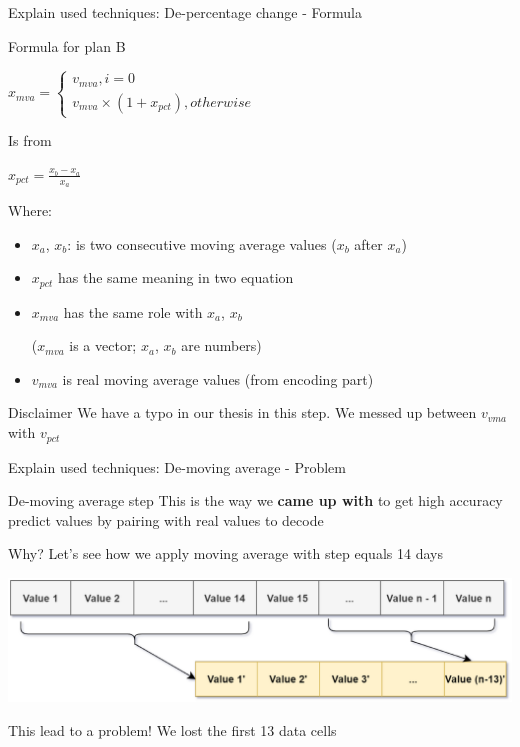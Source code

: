 \documentclass[compress, mathserif, fleqn, 10pt]{beamer}
\begin{document}
	\begin{frame}{Explain used techniques: De-percentage change - Formula}
		\begin{block}{Formula for plan B}
			\centerline{$x_{mva}=\left\{ \begin{array}{l}v_{mva}, i=0 \\ v_{mva} \times\left(1+x_{pct}\right), otherwise\end{array}\right.$}
			
			\smallskip
			
			\centerline{Is from}
			
			\smallskip
			
			\centerline{$x_{pct}=\frac{x_{b} - x_{a}}{x_{a}}$}
			
			\smallskip
			Where:
			
			\begin{itemize}
				\item $x_{a}$, $x_{b}$: is two consecutive moving average values ($x_{b}$
				after $x_{a}$)
				
				\item $x_{pct}$ has the same meaning in two equation
				
				\item $x_{mva}$ has the same role with $x_{a}$, $x_{b}$
				
				($x_{mva}$ is a vector; $x_{a}$, $x_{b}$ are numbers)
				
				\item $v_{mva}$ is real moving average values (from encoding part)
			\end{itemize}
		\end{block}
		
		\begin{exampleblock}{Disclaimer}
			We have a typo in our thesis in this step. We messed up between $v_{vma}$
			with $v_{pct}$
		\end{exampleblock}
	\end{frame}
	
	\begin{frame}{Explain used techniques: De-moving average - Problem}
		\begin{block}{De-moving average step}
			This is the way we \textbf{came up with} to get high accuracy predict
			values by pairing with real values to decode
			
			Why? Let's see how we apply moving average with step equals 14 days
		\end{block}
		\smallskip
		\centerline{\includegraphics[width=\textwidth]{images/enc_moving.eps}}
		\bigskip
		\begin{exampleblock}{This lead to a problem!}
			We lost the first 13 data cells
		\end{exampleblock}
	\end{frame}
	
\end{document}
